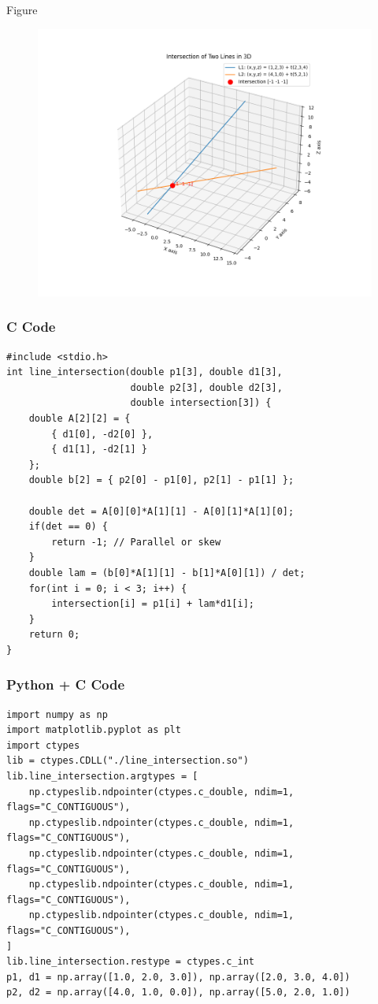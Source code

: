 \documentclass{beamer}
\begin{document}
\begin{frame}{Figure}
\begin{figure}[h!]
    \centering
    \includegraphics[height=0.5\textheight, keepaspectratio]{figs/Figure_1.png}
\end{figure}
\end{frame}

\begin{frame}[fragile]
    \frametitle{C Code}
    \begin{lstlisting}
#include <stdio.h>
int line_intersection(double p1[3], double d1[3],
                      double p2[3], double d2[3],
                      double intersection[3]) {
    double A[2][2] = {
        { d1[0], -d2[0] },
        { d1[1], -d2[1] }
    };
    double b[2] = { p2[0] - p1[0], p2[1] - p1[1] };

    double det = A[0][0]*A[1][1] - A[0][1]*A[1][0];
    if(det == 0) {
        return -1; // Parallel or skew
    }
    double lam = (b[0]*A[1][1] - b[1]*A[0][1]) / det;
    for(int i = 0; i < 3; i++) {
        intersection[i] = p1[i] + lam*d1[i];
    }
    return 0;
}

    \end{lstlisting}
\end{frame}

\begin{frame}[fragile]
    \frametitle{Python + C Code}
    \begin{lstlisting}
import numpy as np
import matplotlib.pyplot as plt
import ctypes
lib = ctypes.CDLL("./line_intersection.so")
lib.line_intersection.argtypes = [
    np.ctypeslib.ndpointer(ctypes.c_double, ndim=1, flags="C_CONTIGUOUS"),
    np.ctypeslib.ndpointer(ctypes.c_double, ndim=1, flags="C_CONTIGUOUS"),
    np.ctypeslib.ndpointer(ctypes.c_double, ndim=1, flags="C_CONTIGUOUS"),
    np.ctypeslib.ndpointer(ctypes.c_double, ndim=1, flags="C_CONTIGUOUS"),
    np.ctypeslib.ndpointer(ctypes.c_double, ndim=1, flags="C_CONTIGUOUS"),
]
lib.line_intersection.restype = ctypes.c_int
p1, d1 = np.array([1.0, 2.0, 3.0]), np.array([2.0, 3.0, 4.0])
p2, d2 = np.array([4.0, 1.0, 0.0]), np.array([5.0, 2.0, 1.0])


    \end{lstlisting}
\end{frame}
\end{document}
